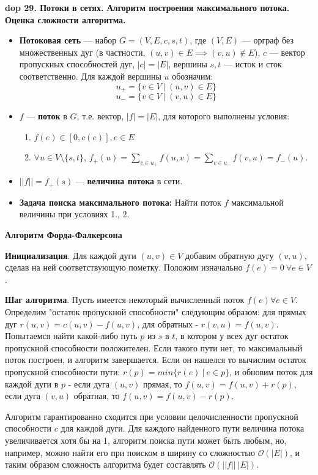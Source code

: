\textbf{\LARGE dop 29. Потоки в сетях. Алгоритм построения максимального потока. Оценка сложности алгоритма.}


\begin{itemize}
    \item \textbf{Потоковая сеть} --- набор $G = (V, E, c, s, t)$, где $(V, E)$ --- орграф без множественных дуг (в частности, $(u,v) \in E \implies (v, u) \notin E$), $c$ --- вектор пропускных способностей дуг, $|c| = |E|$, вершины $s, t$ --- исток и сток соответственно. Для каждой вершины $u$ обозначим:
    $$ u_+ = \{v \in V~|~(u, v) \in E\}$$
    $$u_- = \{v \in V~|~(v, u) \in E\}$$
    \item $f$ --- \textbf{поток} в $G$, т.е. вектор, $|f| = |E|$, для которого выполнены условия:
    \begin{enumerate}
        \item $f(e) \in [0, c(e)], e \in E$
        \item $\forall u \in V \setminus\{s, t\}$, $f_+(u) = \sum_{v \in u_+} f(u, v) = \sum_{v \in u_-} f (v, u) = f_-(u)$.
    \end{enumerate}
    \item $||f|| = f_+(s)$ --- \textbf{величина потока} в сети.
    \item \textbf{Задача поиска максимального потока:}
    Найти поток $f$ максимальной величины при условиях 1., 2.
\end{itemize}

\textbf{Алгоритм Форда-Фалкерсона}

\textbf{Инициализация}.
Для каждой дуги $(u, v) \in V$ добавим обратную дугу $(v, u)$, сделав на ней соответствующую пометку. Положим изначально $f(e) = 0 ~ \forall e \in V$.

\textbf{Шаг алгоритма}.
Пусть имеется некоторый вычисленный поток $f(e) \forall e \in V$. Определим "остаток пропускной способности" следующим образом: для прямых дуг $r(u,v) = c(u,v) - f(u,v)$, для обратных - $r(v,u) = f(u,v)$. Попытаемся найти какой-либо путь $p$ из $s$ в $t$, в котором у всех дуг остаток пропускной способности положителен. Если такого пути нет, то максимальный поток построен, и алгоритм завершается. Если он нашелся то вычислим остаток пропускной способности пути: $r(p) = min\{r(e)~|~e \in p\}$, и обновим поток для каждой дуги в $p$ - если дуга $(u, v)$ прямая, то $f(u, v) = f(u, v) + r(p)$, если дуга $(v, u)$ обратная, то $f(u, v) = f(u, v) - r(p)$. 

Алгоритм гарантированно сходится при условии целочисленности пропускной способности $c$ для каждой дуги. Для каждого найденного пути величина потока увеличивается хотя бы на 1, алгоритм поиска пути может быть любым, но, например, можно найти его при поиском в ширину со сложностью $\mathcal{O}(|E|)$, и таким образом сложность алгоритма будет составлять $\mathcal{O}(||f||~|E|)$.

